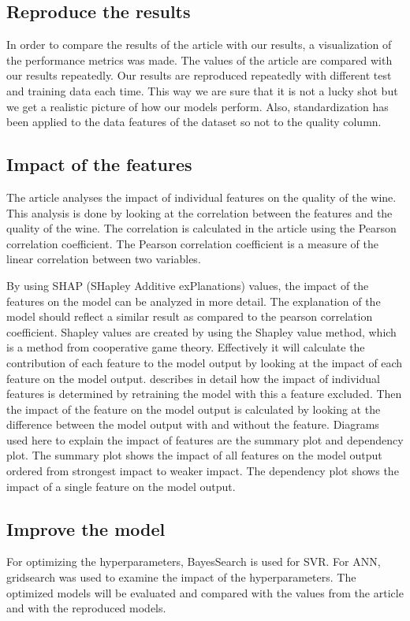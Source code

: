 \documentclass{article}
\begin{document}
\subsection{Reproduce the results}
In order to compare the results of the article with our results, a visualization of the performance metrics was made.
The values of the article \cite{dahal2021prediction} are compared with our results repeatedly.
Our results are reproduced repeatedly with different test and training data each time.
This way we are sure that it is not a lucky shot but we get a realistic picture of how our models perform.
Also, standardization has been applied to the data features of the dataset so not to the quality column.

\subsection{Impact of the features}
The article analyses the impact of individual features on the quality of the wine.
This analysis is done by looking at the correlation between the features and the quality of the wine.
The correlation is calculated in the article using the Pearson correlation coefficient.
The Pearson correlation coefficient is a measure of the linear correlation between two variables.

By using SHAP (SHapley Additive exPlanations) values, the impact of the features on the model can be analyzed in more detail.
The explanation of the model should reflect a similar result as compared to the pearson correlation coefficient.
Shapley values are created by using the Shapley value method, which is a method from cooperative game theory. Effectively it will calculate the contribution of each feature to the model output by looking at the impact of each feature on the model output.
\cite{lundberg2017unified} describes in detail how the impact of individual features is determined by retraining the model with this a feature excluded.
Then the impact of the feature on the model output is calculated by looking at the difference between the model output with and without the feature.
Diagrams used here to explain the impact of features are the summary plot and dependency plot.
The summary plot shows the impact of all features on the model output ordered from strongest impact to weaker impact.
The dependency plot shows the impact of a single feature on the model output.

\subsection{Improve the model}
For optimizing the hyperparameters, BayesSearch is used for SVR. For ANN, gridsearch was used to examine the impact of the hyperparameters. The optimized models will be evaluated and compared with the values from the article and with the reproduced models.
\end{document}
